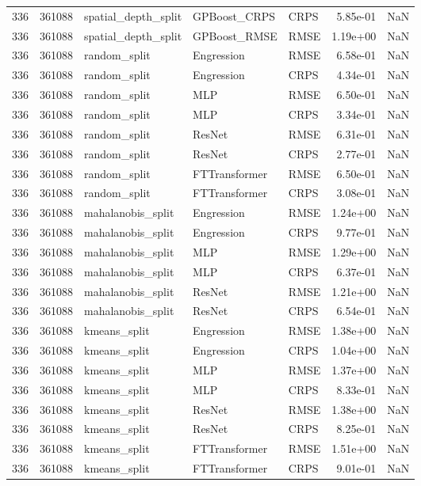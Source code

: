 \begin{tabular}{rrlllrr}
336 & 361088 & spatial\_depth\_split & GPBoost\_CRPS & CRPS & 5.85e-01 & NaN \\
336 & 361088 & spatial\_depth\_split & GPBoost\_RMSE & RMSE & 1.19e+00 & NaN \\
336 & 361088 & random\_split & Engression & RMSE & 6.58e-01 & NaN \\
336 & 361088 & random\_split & Engression & CRPS & 4.34e-01 & NaN \\
336 & 361088 & random\_split & MLP & RMSE & 6.50e-01 & NaN \\
336 & 361088 & random\_split & MLP & CRPS & 3.34e-01 & NaN \\
336 & 361088 & random\_split & ResNet & RMSE & 6.31e-01 & NaN \\
336 & 361088 & random\_split & ResNet & CRPS & 2.77e-01 & NaN \\
336 & 361088 & random\_split & FTTransformer & RMSE & 6.50e-01 & NaN \\
336 & 361088 & random\_split & FTTransformer & CRPS & 3.08e-01 & NaN \\
336 & 361088 & mahalanobis\_split & Engression & RMSE & 1.24e+00 & NaN \\
336 & 361088 & mahalanobis\_split & Engression & CRPS & 9.77e-01 & NaN \\
336 & 361088 & mahalanobis\_split & MLP & RMSE & 1.29e+00 & NaN \\
336 & 361088 & mahalanobis\_split & MLP & CRPS & 6.37e-01 & NaN \\
336 & 361088 & mahalanobis\_split & ResNet & RMSE & 1.21e+00 & NaN \\
336 & 361088 & mahalanobis\_split & ResNet & CRPS & 6.54e-01 & NaN \\
336 & 361088 & kmeans\_split & Engression & RMSE & 1.38e+00 & NaN \\
336 & 361088 & kmeans\_split & Engression & CRPS & 1.04e+00 & NaN \\
336 & 361088 & kmeans\_split & MLP & RMSE & 1.37e+00 & NaN \\
336 & 361088 & kmeans\_split & MLP & CRPS & 8.33e-01 & NaN \\
336 & 361088 & kmeans\_split & ResNet & RMSE & 1.38e+00 & NaN \\
336 & 361088 & kmeans\_split & ResNet & CRPS & 8.25e-01 & NaN \\
336 & 361088 & kmeans\_split & FTTransformer & RMSE & 1.51e+00 & NaN \\
336 & 361088 & kmeans\_split & FTTransformer & CRPS & 9.01e-01 & NaN \\

\end{tabular}
